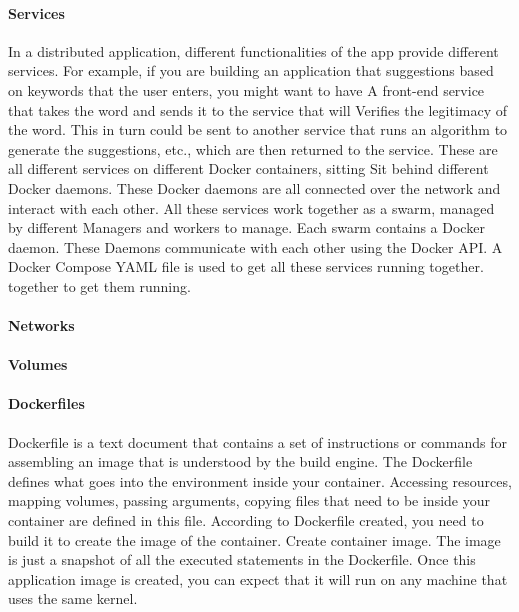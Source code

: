 		\paragraph{Services}
		In a distributed application, different functionalities of the app provide different services. For example, if you are building an application that suggestions based on keywords that the user enters, you might want to have A front-end service that takes the word and sends it to the service that will Verifies the legitimacy of the word. This in turn could be sent to another service that runs an algorithm to generate the suggestions, etc., which are then returned to the service. These are all different services on different Docker containers, sitting Sit behind different Docker daemons. These Docker daemons are all connected over the network and interact with each other.
		All these services work together as a swarm, managed by different Managers and workers to manage. Each swarm contains a Docker daemon. These Daemons communicate with each other using the Docker API. A Docker Compose YAML file is used to get all these services running together. together to get them running. 

		\paragraph{Networks}

		\paragraph{Volumes}
			
			
		\paragraph{Dockerfiles}
		Dockerfile is a text document that contains a set of instructions or commands for assembling an image that is understood by the build engine. The Dockerfile defines what goes into the environment inside your container. Accessing resources, mapping volumes, passing arguments, copying files that need to be inside your container are defined in this file. According to Dockerfile created, you need to build it to create the image of the container. Create container image. The image is just a snapshot of all the executed statements in the Dockerfile. Once this application image is created, you can expect that it will run on any machine that uses the same kernel. 
		
